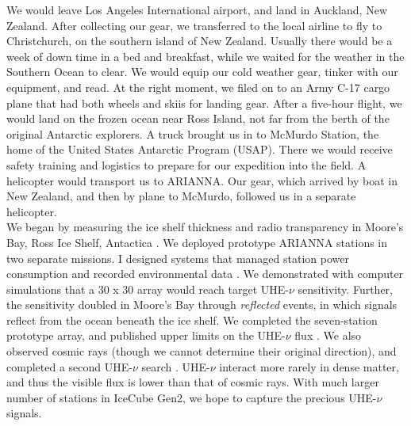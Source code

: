 \documentclass[../../main.tex]{subfiles}
\begin{document}
We would leave Los Angeles International airport, and land in Auckland, New Zealand.  After collecting our gear, we transferred to the local airline to fly to Christchurch, on the southern island of New Zealand.  Usually there would be a week of down time in a bed and breakfast, while we waited for the weather in the Southern Ocean to clear.  We would equip our cold weather gear, tinker with our equipment, and read.  At the right moment, we filed on to an Army C-17 cargo plane that had both wheels and skiis for landing gear.  After a five-hour flight, we would land on the frozen ocean near Ross Island, not far from the berth of the original Antarctic explorers.  A truck brought us in to McMurdo Station, the home of the United States Antarctic Program (USAP).  There we would receive safety training and logistics to prepare for our expedition into the field.  A helicopter would transport us to ARIANNA.  Our gear, which arrived by boat in New Zealand, and then by plane to McMurdo, followed us in a separate helicopter.
\\
\vspace{0.25cm}
We began by measuring the ice shelf thickness and radio transparency in Moore's Bay, Ross Ice Shelf, Antactica \cite{icrc}.  We deployed prototype ARIANNA stations in two separate missions.  I designed systems that managed station power consumption and recorded environmental data \cite{10.1109/tns.2015.2468182} \cite{10.1016/j.nima.2010.09.032}.  We demonstrated with computer simulations that a 30 x 30 array would reach target UHE-$\nu$ sensitivity.  Further, the sensitivity doubled in Moore's Bay through \textit{reflected} events, in which signals reflect from the ocean beneath the ice shelf.  We completed the seven-station prototype array, and published upper limits on the UHE-$\nu$ flux \cite{10.1016/j.astropartphys.2015.04.002}.  We also observed cosmic rays \cite{cr} (though we cannot determine their original direction), and completed a second UHE-$\nu$ search \cite{4_5}.  UHE-$\nu$ interact more rarely in dense matter, and thus the visible flux is lower than that of cosmic rays.  With much larger number of stations in IceCube Gen2, we hope to capture the precious UHE-$\nu$ signals.
\\
\vspace{0.25cm}
\end{document}
